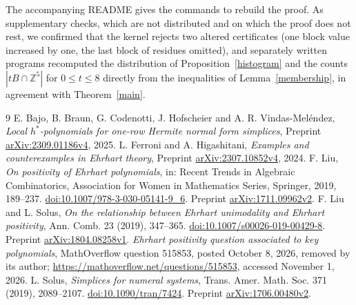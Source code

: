 \documentclass[11pt]{article}
\theoremstyle{remark}
\newcommand{\ZZ}{\mathbb{Z}}
\begin{document}
The accompanying README gives the commands to rebuild the proof. As supplementary checks, which are not distributed and on which the proof does not rest, we confirmed that the kernel rejects two altered certificates (one block value increased by one, the last block of residues omitted), and separately written programs recomputed the distribution of Proposition~\ref{histogram} and the counts $|tB\cap\ZZ^5|$ for $0\le t\le8$ directly from the inequalities of Lemma~\ref{membership}, in agreement with Theorem~\ref{main}.

\begin{thebibliography}{9}\small
{} E. Bajo, B. Braun, G. Codenotti, J. Hofscheier and A. R. Vindas-Mel\'endez,
\emph{Local $h^*$-polynomials for one-row Hermite normal form simplices},
Preprint \href{https://arxiv.org/abs/2309.01186v4}{arXiv:2309.01186v4}, 2025.
 L. Ferroni and A. Higashitani,
\emph{Examples and counterexamples in Ehrhart theory},
Preprint \href{https://arxiv.org/abs/2307.10852v4}{arXiv:2307.10852v4}, 2024.
 F. Liu,
\emph{On positivity of Ehrhart polynomials},
in: Recent Trends in Algebraic Combinatorics, Association for Women in Mathematics Series, Springer, 2019, 189--237.
\href{https://doi.org/10.1007/978-3-030-05141-9_6}{doi:10.1007/978-3-030-05141-9\_6}.
Preprint \href{https://arxiv.org/abs/1711.09962v2}{arXiv:1711.09962v2}.
 F. Liu and L. Solus,
\emph{On the relationship between Ehrhart unimodality and Ehrhart positivity},
Ann. Comb. 23 (2019), 347--365.
\href{https://doi.org/10.1007/s00026-019-00429-8}{doi:10.1007/s00026-019-00429-8}.
Preprint \href{https://arxiv.org/abs/1804.08258v1}{arXiv:1804.08258v1}.
 \emph{Ehrhart positivity question associated to key polynomials},
MathOverflow question 515853, posted October 8, 2026, removed by its author;
\url{https://mathoverflow.net/questions/515853}, accessed November 1, 2026.
 L. Solus,
\emph{Simplices for numeral systems},
Trans. Amer. Math. Soc. 371 (2019), 2089--2107.
\href{https://doi.org/10.1090/tran/7424}{doi:10.1090/tran/7424}.
Preprint \href{https://arxiv.org/abs/1706.00480v2}{arXiv:1706.00480v2}.
\end{thebibliography}
\end{document}
